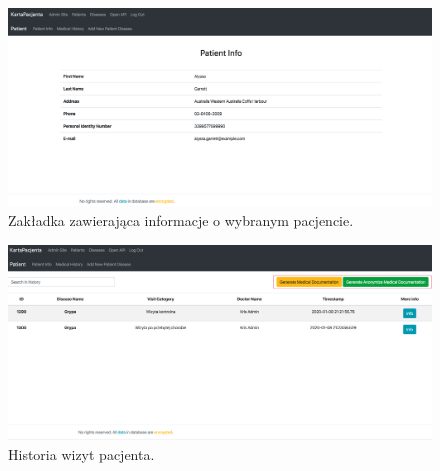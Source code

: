 \begin{figure}[H]
\centering
\includegraphics[width=15cm]{pictures/service/05-patient_info}
\caption{Zakładka zawierająca informacje o wybranym pacjencie.}
\end{figure}

\begin{figure}[H]
\centering
\includegraphics[width=15cm]{pictures/service/06-choroby_pacjenta}
\caption{Historia wizyt pacjenta.}
\end{figure}

